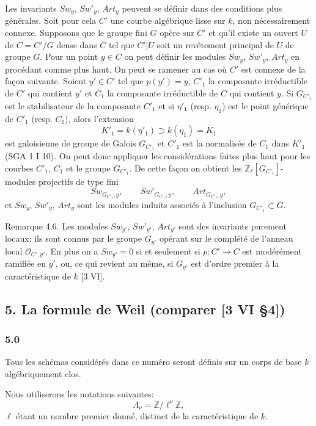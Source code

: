 \documentclass[11pt]{article}
\begin{document}
Les invariants $Sw_y$, $Sw'_y$, $Art_y$ peuvent se définir dans des conditions plus générales. Soit pour cela $C'$ une courbe algébrique lisse sur $k$, non nécessairement connexe. Supposons que le groupe fini $G$ opère sur $C'$ et qu'il existe un ouvert $U$ de $C=C'/G$ dense dans $C$ tel que $C'|U$ soit un revêtement principal de $U$ de groupe $G$. Pour un point $y\in C$ on peut définir les modules $Sw_y$, $Sw'_y$, $Art_y$ en procédant comme plus haut. On peut se ramener au cas où $C'$ est connexe de la façon suivante. Soient $y'\in C'$ tel que $p(y')=y$, $C'_1$ la composante irréductible de $C'$ qui contient $y'$ et $C_1$ la composante irréductible de $C$ qui contient $y$. Si $G_{C'_1}$ est le stabilisateur de la composante $C'_1$ et si $\eta'_1$ (resp. $\eta_1$) est le point générique de $C'_1$ (resp. $C_1$), alors l'extension
\[
K'_1=k(\eta'_1)\supset k(\eta_1)=K_1
\]
est galoisienne de groupe de Galois $G_{C'_1}$ et $C'_1$ est la normalisée de $C_1$ dans $K'_1$ (SGA 1 I 10). On peut donc appliquer les considérations faites plus haut pour les courbes $C'_1$, $C_1$ et le groupe $G_{C'_1}$. De cette façon on obtient les $\mathbb Z_\ell[G_{C'_1}]$-modules projectifs de type fini
\[
Sw_{G_{C'_1},y},\qquad Sw'_{G_{C'_1},y},\qquad Art_{G_{C'_1},y},
\]
et $Sw_y$, $Sw'_y$, $Art_y$ sont les modules induits associés à l'inclusion $G_{C'_1}\subset G$.

Remarque 4.6. Les modules $Sw_{y'}$, $Sw'_{y'}$, $Art_{y'}$ sont des invariants purement locaux: ils sont connus par le groupe $G_{y'}$ opérant sur le complété de l'anneau local $\mathcal O_{C',y'}$. En plus on a $Sw_{y'}=0$ si et seulement si $p:C'\to C$ est modérément ramifiée en $y'$, ou, ce qui revient au même, si $G_{y'}$ est d'ordre premier à la caractéristique de $k$ [3 VI].

\subsection*{5. La formule de Weil (comparer [3 VI §4])}

\subsubsection*{5.0}

Tous les schémas considérés dans ce numéro seront définis sur un corps de base $k$ algébriquement clos.

Nous utiliserons les notations suivantes:
\[
\Lambda_\nu=\mathbb Z/\ell^\nu\mathbb Z,
\]
$\ell$ étant un nombre premier donné, distinct de la caractéristique de $k$.
\end{document}
